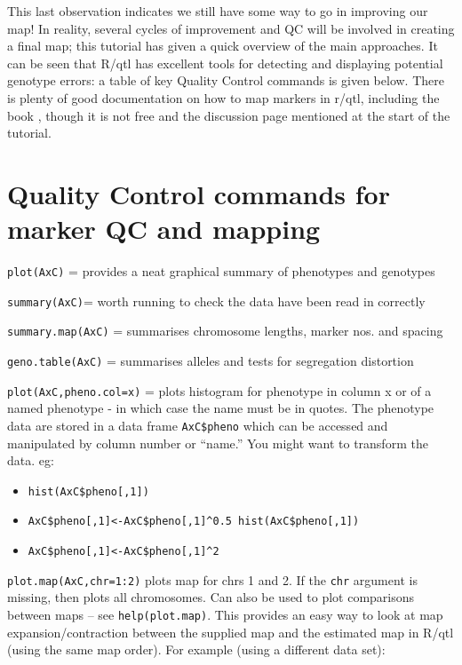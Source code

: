 \documentclass[
]{book}
\providecommand{\tightlist}{%
  \setlength{\itemsep}{0pt}\setlength{\parskip}{0pt}}
\begin{document}
This last observation indicates we still have some way to go in improving our map! In reality, several cycles of improvement and QC will be involved in creating a final map; this tutorial has given a quick overview of the main approaches. It can be seen that R/qtl has excellent tools for detecting and displaying potential genotype errors: a table of key Quality Control commands is given below. There is plenty of good documentation on how to map markers in r/qtl, including the book \citet{broman_guide_2009}, though it is not free and the discussion page mentioned at the start of the tutorial.

\hypertarget{quality-control-commands-for-marker-qc-and-mapping}{%
\section{Quality Control commands for marker QC and mapping}\label{quality-control-commands-for-marker-qc-and-mapping}}

\texttt{plot(AxC)} = provides a neat graphical summary of phenotypes and genotypes

\texttt{summary(AxC)}= worth running to check the data have been read in correctly

\texttt{summary.map(AxC)} = summarises chromosome lengths, marker nos. and spacing

\texttt{geno.table(AxC)} = summarises alleles and tests for segregation distortion

\texttt{plot(AxC,pheno.col=x)} = plots histogram for phenotype in column x or of a named phenotype - in which case the name must be in quotes. The phenotype data are stored in a data frame \texttt{AxC\$pheno} which can be accessed and manipulated by column number or ``name.'' You might want to transform the data. eg:

\begin{itemize}
\tightlist
\item
  \texttt{hist(AxC\$pheno{[},1{]})}
\item
  \texttt{AxC\$pheno{[},1{]}\textless{}-AxC\$pheno{[},1{]}\^{}0.5\ hist(AxC\$pheno{[},1{]})}
\item
  \texttt{AxC\$pheno{[},1{]}\textless{}-AxC\$pheno{[},1{]}\^{}2}
\end{itemize}

\texttt{plot.map(AxC,chr=1:2)} plots map for chrs 1 and 2. If the \texttt{chr} argument is missing,
then plots all chromosomes. Can also be used to plot comparisons between maps -- see \texttt{help(plot.map)}. This provides an easy way to look at map expansion/contraction between the supplied map and the estimated map in R/qtl (using the same map order). For example (using a different data set):
\end{document}
